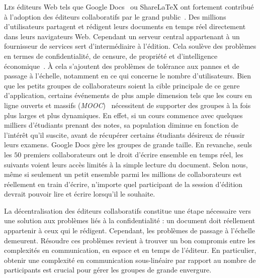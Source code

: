 
\lettrine{L}es éditeurs Web tels que Google Docs~\cite{googledocs} ou
ShareLaTeX\cite{sharelatex} ont fortement contribué à l'adoption des éditeurs
collaboratifs par le grand public~\cite{mogan2010impact}. Des millions
d'utilisateurs partagent et rédigent leurs documents en temps réel directement
dans leurs navigateurs Web. Cependant un serveur central appartenant à un
fournisseur de services sert d'intermédiaire à l'édition. Cela soulève des
problèmes en termes de confidentialité, de censure, de propriété et
d'intelligence économique~\cite{cherrueau2016composer, gellman2013us,
pearson2011toward}. À cela s'ajoutent des problèmes de tolérance aux pannes et
de passage à l'échelle, notamment en ce qui concerne le nombre
d'utilisateurs. Bien que les petits groupes de collaborateurs soient la cible
principale de ce genre d'application, certains événements de plus ample
dimension tels que les cours en ligne ouverts et massifs
(\emph{MOOC})~\cite{breslow2013studying} nécessitent de supporter des groupes à
la fois plus larges et plus dynamiques. En effet, si un cours commence avec
quelques milliers d'étudiants prenant des notes, sa population diminue en
fonction de l'intérêt qu'il suscite, avant de récupérer certains étudiants
désireux de réussir leurs examens. Google Docs gère les groupes de grande
taille. En revanche, seuls les $50$ premiers collaborateurs ont le droit
d'écrire ensemble en temps réel, les suivants voient leurs accès limités à la
simple lecture du document. Selon nous, même si seulement un petit ensemble
parmi les millions de collaborateurs est réellement en train d'écrire, n'importe
quel participant de la session d'édition devrait pouvoir lire et écrire
lorsqu'il le souhaite.

La décentralisation des éditeurs collaboratifs constitue une étape nécessaire
vers une solution aux problèmes liés à la confidentialité : un document doit
réellement appartenir à ceux qui le rédigent. Cependant, les problèmes de
passage à l'échelle demeurent. Résoudre ces problèmes revient à trouver un bon
compromis entre les complexités en communication, en espace et en temps de
l'éditeur. En particulier, obtenir une complexité en communication sous-linéaire
par rapport au nombre de participants est crucial pour gérer les groupes de
grande envergure.

